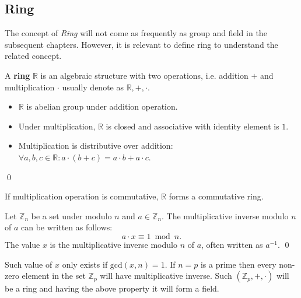 \subsection{Ring}
The concept of \textit{Ring} will not come as frequently as group and field in the subsequent chapters. 
However, it is relevant to define ring to understand the related concept.
\begin{definition}
	A \textbf{ring} $\mathbb{R}$ is an algebraic structure with two operations, i.e. addition  $+$ and  multiplication $\cdot$  usually denote as $\mathbb{R},+,\cdot$.
	\begin{itemize}
		\item $\mathbb{R}$ is abelian group under addition operation.
		\item Under multiplication, $\mathbb{R}$ is closed and associative with identity element is $1$.
		\item  Multiplication is distributive over addition: $ \forall a, b, c \in \mathbb{R}: a\cdot (b+c) = a\cdot b + a\cdot c$.
	\end{itemize}
\qed
\end{definition}
If multiplication operation is commutative, $\mathbb{R}$  forms a commutative ring.
\begin{definition}
	Let $\mathbb{Z}_n$ be a set under modulo $n$ and $a \in \mathbb{Z}_n$. 
	The multiplicative inverse modulo $n$ of $a$ can be written as  follows:
	$$a\cdot x \equiv  1 \bmod n.$$
The value $x$ is the multiplicative inverse modulo $n$ of $a$, often written as $a^{-1}$.
\qed
\end{definition}
Such value of $x$ only exists if $\text{gcd}(x,n)=1$.
If $n=p$ is a prime then every non-zero element in the set $\mathbb{Z}_p$ will have multiplicative inverse.
Such $(\mathbb{Z}_p,+,\cdot)$ will be a ring and having the above property it will form a field.

